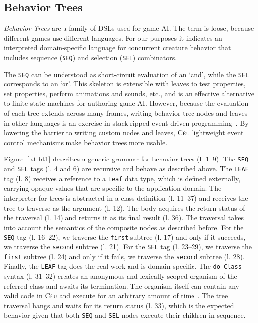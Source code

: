 \documentclass{sig-alternate}
\newcommand{\CEU}{\textsc{C\'{e}u}\xspace}
\newcommand{\code}[1] {{\small{\texttt{#1}}}}
\begin{document}
\subsection{Behavior Trees}
\label{subsec.bt}

\emph{Behavior Trees} are a family of DSLs used for game AI.
The term is loose, because different games use different languages.
For our purposes it indicates an interpreted domain-specific language
for concurrent creature behavior that includes sequence (\code{SEQ}) and 
selection (\code{SEL}) combinators.

The \code{SEQ} can be understood as short-circuit evaluation of an `and',
while the \code{SEL} corresponds to an `or'.
This skeleton is extensible with leaves to test properties, set properties, 
perform animations and sounds, etc., and is an effective alternative to finite 
state machines for authoring game AI.
%
However, because the evaluation of each tree extends across many frames, 
writing behavior tree nodes and leaves in other languages is an exercise in 
stack-ripped event-driven programming~\cite{krohn2007events}.
%
%
By lowering the barrier to writing custom nodes and leaves, \CEU lightweight 
event control mechanisms make behavior trees more usable.

Figure~\ref{lst.bt1} describes a generic grammar for behavior trees (l. 
1--9).
The \code{SEQ} and \code{SEL} tags (l. 4 and 6) are recursive and behave as 
described above.
The \code{LEAF} tag (l. 8) receives a reference to a \code{Leaf} data type, 
which is defined externally, carrying opaque values that are specific to the 
application domain.
%
The interpreter for trees is abstracted in a class definition (l. 11--37) 
and receives the tree to traverse as the argument (l. 12).
The body acquires the return status of the traversal (l. 14) and returns it 
as its final result (l. 36).
%
The traversal takes into account the semantics of the composite nodes as 
described before.
%
For the \code{SEQ} tag (l. 16--22), we traverse the \code{first} subtree 
(l. 17) and only if it succeeds, we traverse the \code{second} subtree (l. 
21).
%
For the \code{SEL} tag (l. 23--29), we traverse the \code{first} subtree 
(l. 24) and only if it fails, we traverse the \code{second} subtree (l. 
28).
%
Finally, the \code{LEAF} tag does the real work and is domain specific.
The \code{do Class} syntax (l. 31--32) creates an anonymous and lexically 
scoped organism of the referred class and awaits its termination.
The organism itself can contain any valid code in \CEU and execute for an 
arbitrary amount of time~\cite{ceu.mod15}.
The tree traversal hangs and waits for its return status (l. 33), which is 
the expected behavior given that both \code{SEQ} and \code{SEL} nodes execute 
their children in sequence.
\end{document}
